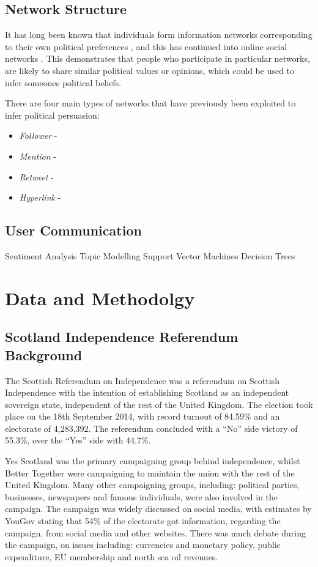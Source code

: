 \documentclass[bsc,frontabs,singlespacing,parskip]{infthesis}     %
\begin{document}
\section{Network Structure}

It has long been known that individuals form information networks corresponding to their own political preferences \cite{socialflow}, and this has continued into online social networks \cite{birdsofafeather}. This demonstrates that people who participate in particular networks, are likely to share similar political values or opinions, which could be used to infer someones political beliefs.

There are four main types of networks that have previously been exploited to infer political persuasion:
\begin{itemize}
\item{\textit{Follower} - }
\item{\textit{Mention} - }
\item{\textit{Retweet} - }
\item{\textit{Hyperlink} - }
\end{itemize}

\section{User Communication}

Sentiment Analysis 
Topic Modelling
Support Vector Machines
Decision Trees


\chapter{Data and Methodolgy}
\section{Scotland Independence Referendum Background}
\label{sec:indybackground}
The Scottish Referendum on Independence was a referendum on Scottish Independence with the intention of establishing Scotland as an independent sovereign state, independent of the rest of the United Kingdom. The election took place on the 18th September 2014, with record turnout of 84.59\% and an electorate of 4,283,392. The referendum concluded with a ``No'' side victory of 55.3\%, over the ``Yes'' side with 44.7\%.

Yes Scotland was the primary campaigning group behind independence, whilst Better Together were campaigning to maintain the union with the rest of the United Kingdom. Many other campaigning groups, including: political parties, businesses, newspapers and famous individuals, were also involved in the campaign. The campaign was widely discussed on social media, with estimates by YouGov stating that 54\% of the electorate got information, regarding the campaign, from social media and other websites. There was much debate during the campaign, on issues including: currencies and monetary policy, public expenditure, EU membership and north sea oil revenues. 
\end{document}
